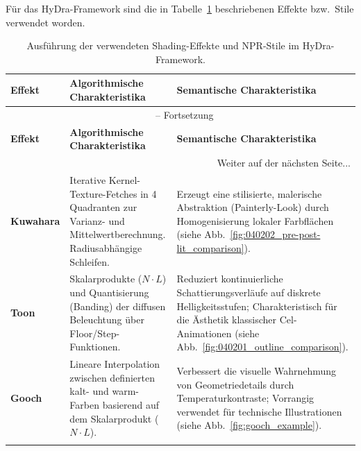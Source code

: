 Für das \ac{HyDra}-Framework sind die in Tabelle~\ref{tab:shading_effects} beschriebenen Effekte bzw.\ Stile verwendet
worden.

\begin{longtable}{@{} p{} p{} p{} @{}}
    \caption[Shading-Effekte und NPR-Stile im HyDra-Framework]{Ausführung der verwendeten Shading-Effekte und NPR-Stile
    im HyDra-Framework.}
    \label{tab:shading_effects} \\
    \toprule
    \textbf{Effekt} & \textbf{Algorithmische Charakteristika} & \textbf{Semantische Charakteristika} \\
    \midrule
    \endfirsthead

    \multicolumn{3}{c}{{\tablename\ \thetable{} -- Fortsetzung}} \\
    \toprule
    \textbf{Effekt} & \textbf{Algorithmische Charakteristika} & \textbf{Semantische Charakteristika} \\
    \midrule
    \endhead

    \midrule
    \multicolumn{3}{r}{{Weiter auf der nächsten Seite...}} \\
    \endfoot

    \bottomrule
    \endlastfoot

    \textbf{Kuwahara}\newline \parencites(vgl.)()[]{kyprianidisImageVideoAbstraction2009}[]{papariArtisticEdgeCorner2007} &
    Iterative Kernel-Texture-Fetches in 4 Quadranten zur Varianz- und Mittelwertberechnung.
    Radiusabhängige Schleifen.
    & Erzeugt eine stilisierte, malerische Abstraktion (Painterly-Look) durch Homogenisierung lokaler Farbflächen
    (siehe Abb.~\ref{fig:040202_pre-post-lit_comparison}).\\
    \addlinespace

    \midrule

    \textbf{Toon}\newline \parencite[vgl.][]{lakeStylizedRenderingTechniques2000} &
    Skalarprodukte ($N \cdot L$) und Quantisierung (Banding) der diffusen Beleuchtung über Floor/Step-Funktionen.
    & Reduziert kontinuierliche Schattierungsverläufe auf diskrete Helligkeitsstufen; Charakteristisch für die Ästhetik
    klassischer Cel-Animationen (siehe Abb.~\ref{fig:040201_outline_comparison}). \\
    \addlinespace

    \midrule

    \textbf{Gooch}\newline \parencite[vgl.][]{goochNonphotorealisticLightingModel1998} &
    Lineare Interpolation zwischen definierten kalt- und warm-Farben basierend auf dem Skalarprodukt ($N \cdot L$).
    & Verbessert die visuelle Wahrnehmung von Geometriedetails durch Temperaturkontraste; Vorrangig verwendet für
    technische Illustrationen (siehe Abb.~\ref{fig:gooch_example}). \\
    \addlinespace


\end{longtable}
